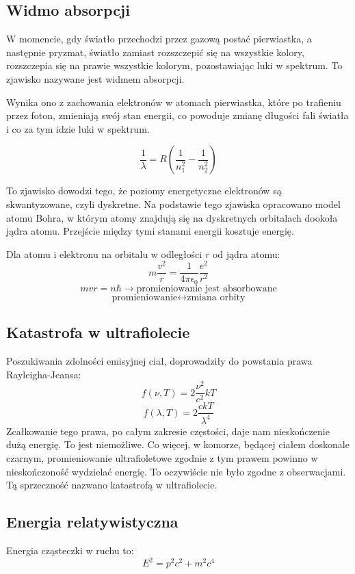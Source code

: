 \documentclass{../notatki}
\begin{document}
\subsection{Widmo absorpcji}

W momencie, gdy światło przechodzi przez gazową postać pierwiastka, a następnie
pryzmat, światło zamiast rozszczepić się na wszystkie kolory, rozszczepia się
na prawie wszystkie kolorym, pozostawiając luki w spektrum. To zjawisko
nazywane jest widmem absorpcji.

Wynika ono z zachowania elektronów w atomach pierwiastka, które po trafieniu
przez foton, zmieniają swój stan energii, co powoduje zmianę długości fali
światła i co za tym idzie luki w spektrum.

$$
\frac{1}{\lambda} = R \left( \frac{1}{n_1^2} - \frac{1}{n_2^2} \right)
$$

To zjawisko dowodzi tego, że poziomy energetyczne elektronów są skwantyzowane,
czyli dyskretne. Na podstawie tego zjawiska opracowano model atomu Bohra, w
którym atomy znajdują się na dyskretnych orbitalach dookoła jądra atomu.
Przejście między tymi stanami energii kosztuje energię.

Dla atomu i elektronu na orbitalu w odległości $r$ od jądra atomu:
$$
m \frac{v^2}{r} = \frac{1}{4 \pi \epsilon_0} \frac{e^2}{r^2}
$$
$$
mvr = n\hbar \rightarrow \text{promieniowanie jest absorbowane}
$$
$$
\text{promieniowanie} \leftrightarrow \text{zmiana orbity}
$$

\subsection{Katastrofa w ultrafiolecie}

Poszukiwania zdolności emisyjnej ciał, doprowadziły do powstania
prawa Rayleigha-Jeansa:
$$
f(\nu, T) = 2 \frac{\nu^2}{c^2} kT
$$
$$
f(\lambda, T) = 2 \frac{ckT}{\lambda^4}
$$
Zcałkowanie tego prawa, po całym zakresie częstości, daje nam nieskończenie dużą
energię. To jest niemożliwe. Co więcej, w komorze, będącej ciałem
doskonale czarnym, promieniowanie ultrafioletowe zgodnie z tym prawem
powinno w nieskończoność wydzielać energię. To oczywiście nie było
zgodne z obserwacjami. Tą sprzeczność nazwano katastrofą w ultrafiolecie.

\subsection{Energia relatywistyczna}

Energia cząsteczki w ruchu to:
$$
E^2 = p^2c^2 + m^2c^4
$$
\end{document}
